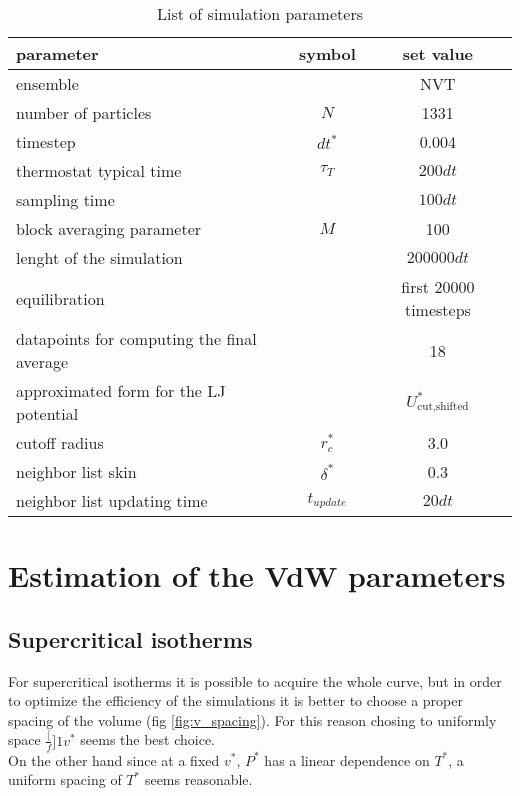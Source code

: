 \documentclass[a4paper, 11pt]{article}
\begin{document}
    \begin{table}[H]
      \centering
      \begin{tabular}{lcc}
        \toprule
        parameter & symbol & set value \\
        \midrule
        ensemble & & NVT \\
        number of particles & $N$ & 1331 \\
        timestep & $dt^*$ & 0.004 \\
        thermostat typical time & $\tau_T$ & $200 dt$ \\
        sampling time & & $100 dt$ \\
        block averaging parameter & $M$ & 100 \\
        lenght of the simulation & & $200000 dt$ \\
        equilibration & & first 20000 timesteps \\
        datapoints for computing the final average & & 18 \\
        approximated form for the LJ potential & & $U_{\text{cut,shifted}}^*$ \\
        cutoff radius & $r_c^*$ & 3.0 \\
        neighbor list skin & $\delta^*$ & 0.3 \\
        neighbor list updating time & $t_{update}$ & $20 dt$ \\
        \bottomrule
      \end{tabular}
      \caption{List of simulation parameters}
      \label{tab:parlist}
    \end{table}



\section{Estimation of the VdW parameters}
  \subsection{Supercritical isotherms}
    For supercritical isotherms it is possible to acquire the whole curve, but in order to optimize the efficiency of the simulations it is better to choose a proper spacing of the volume (fig \ref{fig:v_spacing}). For this reason chosing to uniformly space $\frac[f]{1}{v^*}$ seems the best choice. \\
    On the other hand since at a fixed $v^*$, $P^*$ has a linear dependence on $T^*$, a uniform spacing of $T^*$ seems reasonable.
\end{document}
